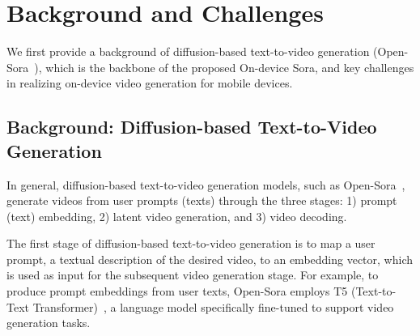 
\section{Background and Challenges}

We first provide a background of diffusion-based text-to-video generation (\eg Open-Sora~\cite{opensora}), which is the backbone of the proposed On-device Sora, and key challenges in realizing on-device video generation for mobile devices.

\subsection{Background: Diffusion-based Text-to-Video Generation}
\label{sec:background}


In general, diffusion-based text-to-video generation models, such as Open-Sora~\cite{opensora}, generate videos from user prompts (texts) through the three stages: 1) prompt (text) embedding, 2) latent video generation, and 3) video decoding.

\iffalse
\begin{figure}[!t]
\centering
\texttt{[image: figures/opensora.pdf]}
    \caption{Open-Sora~\cite{opensora} generates realistic videos from the user prompt (text) through three stages: 1) prompt embedding, 2) latent video generation, and 3) video decoding.}
    \label{Open_Sora_Architecture}
\end{figure}
\fi

The first stage of diffusion-based text-to-video generation is to map a user prompt, a textual description of the desired video, to an embedding vector, which is used as input for the subsequent video generation stage. For example, to produce prompt embeddings from user texts, Open-Sora employs T5 (Text-to-Text Transformer)~\cite{raffel2020exploring}, a language model specifically fine-tuned to support video generation tasks.

